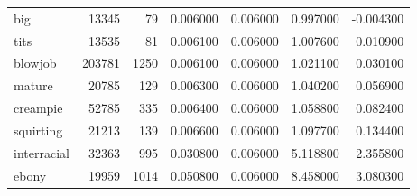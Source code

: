 \begin{tabular}{lrrrrrr}
big & 13345 & 79 & 0.006000 & 0.006000 & 0.997000 & -0.004300 \\
tits & 13535 & 81 & 0.006100 & 0.006000 & 1.007600 & 0.010900 \\
blowjob & 203781 & 1250 & 0.006100 & 0.006000 & 1.021100 & 0.030100 \\
mature & 20785 & 129 & 0.006300 & 0.006000 & 1.040200 & 0.056900 \\
creampie & 52785 & 335 & 0.006400 & 0.006000 & 1.058800 & 0.082400 \\
squirting & 21213 & 139 & 0.006600 & 0.006000 & 1.097700 & 0.134400 \\
interracial & 32363 & 995 & 0.030800 & 0.006000 & 5.118800 & 2.355800 \\
ebony & 19959 & 1014 & 0.050800 & 0.006000 & 8.458000 & 3.080300 \\
\bottomrule
\end{tabular}
